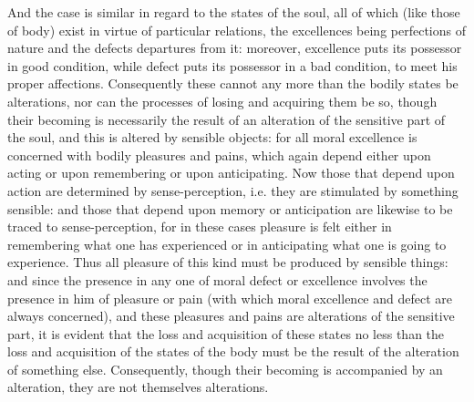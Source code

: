 And the case is similar in regard to the states of the soul, all of
which (like those of body) exist in virtue of particular relations,
the excellences being perfections of nature and the defects departures
from it: moreover, excellence puts its possessor in good condition,
while defect puts its possessor in a bad condition, to meet his proper
affections. Consequently these cannot any more than the bodily states
be alterations, nor can the processes of losing and acquiring them
be so, though their becoming is necessarily the result of an alteration
of the sensitive part of the soul, and this is altered by sensible
objects: for all moral excellence is concerned with bodily pleasures
and pains, which again depend either upon acting or upon remembering
or upon anticipating. Now those that depend upon action are determined
by sense-perception, i.e. they are stimulated by something sensible:
and those that depend upon memory or anticipation are likewise to
be traced to sense-perception, for in these cases pleasure is felt
either in remembering what one has experienced or in anticipating
what one is going to experience. Thus all pleasure of this kind must
be produced by sensible things: and since the presence in any one
of moral defect or excellence involves the presence in him of pleasure
or pain (with which moral excellence and defect are always concerned),
and these pleasures and pains are alterations of the sensitive part,
it is evident that the loss and acquisition of these states no less
than the loss and acquisition of the states of the body must be the
result of the alteration of something else. Consequently, though their
becoming is accompanied by an alteration, they are not themselves
alterations. 

